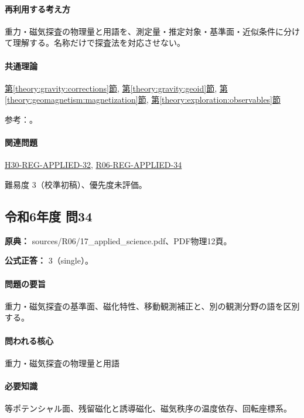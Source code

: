 \paragraph{再利用する考え方} 重力・磁気探査の物理量と用語を、測定量・推定対象・基準面・近似条件に分けて理解する。名称だけで探査法を対応させない。

\paragraph{共通理論} \hyperref[theory:gravity:corrections]{第\ref*{theory:gravity:corrections}節}, \hyperref[theory:gravity:geoid]{第\ref*{theory:gravity:geoid}節}, \hyperref[theory:geomagnetism:magnetization]{第\ref*{theory:geomagnetism:magnetization}節}, \hyperref[theory:exploration:observables]{第\ref*{theory:exploration:observables}節}

\par 参考：\cite{gsi_gravity_definitions,kanaya_okuma2011}。

\paragraph{関連問題} \hyperref[q:h30-reg-applied-32]{H30-REG-APPLIED-32}, \hyperref[q:r06-reg-applied-34]{R06-REG-APPLIED-34}

\par 難易度 3（校準初稿）、優先度未評価。

\subsection{令和6年度 問34}
\label{q:r06-reg-applied-34}

\noindent\textbf{原典：} sources/R06/17\_applied\_science.pdf、PDF物理12頁。

\textbf{公式正答：} 3（single）。

\paragraph{問題の要旨} 重力・磁気探査の基準面、磁化特性、移動観測補正と、別の観測分野の語を区別する。

\paragraph{問われる核心} 重力・磁気探査の物理量と用語

\paragraph{必要知識} 等ポテンシャル面、残留磁化と誘導磁化、磁気秩序の温度依存、回転座標系。

